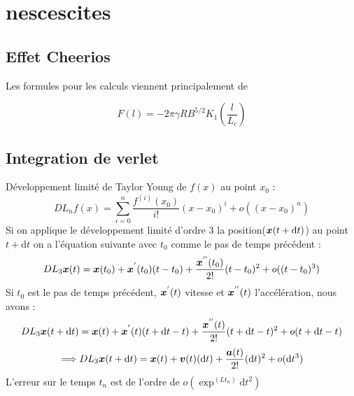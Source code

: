 \documentclass[a4paper, 11pt, oneside]{article} %
\newcommand{\dd}[1]{\mathrm{d}#1}
\begin{document}
    \section{nescescites}
    \subsection{Effet Cheerios}
    Les formules pour les calculs viennent principalement de \cite{vella_cheerios_2005} 

    \begin{equation}
        \label{ForceEntreCheerios}
        F(l) = -2\pi \gamma R B^{5/2} K_1 \left( \frac{l}{L_c}\right)
    \end{equation}
    \subsection{Integration de verlet}
    Développement limité de Taylor Young de $f(x)$ au point $x_0$\cite{agarwal_introduction_2011} :%
    \begin{equation}
        DL_n f(x) = \sum_{i=0}^{n}\frac{f^{(i)}(x_0)}{i!}(x-x_0)^i+ o((x-x_0)^n)
    \end{equation}
    Si on applique le développement limité d'ordre 3 la position($\vb*{x}(t+\dd t)$) au point $t+\dd t$ on a l'équation suivante avec $t_0$ comme le pas de temps précédent :
    \[DL_3 \vb*{x}(t) = \vb*{x}(t_0)+\vb*{x}^{'}(t_0)(t-t_0)+\frac{\vb*{x}^{''}(t_0)}{2!}(t-t_0)^2 +o((t-t_0)^3)\]
    Si $t_0$ est le pas de temps précédent, $\vb*{x}^{'}(t)$ vitesse et $\vb*{x}^{''}(t)$ l'accélération, nous avons :
        \[DL_3 \vb*{x}(t+\dd t) = \vb*{x}(t)+\vb*{x}^{'}(t)(t+\dd t-t)+\frac{\vb*{x}^{''}(t)}{2!}(t+\dd t-t)^2+o(t+\dd t-t)\]
        \[\Longrightarrow DL_3 \vb*{x}(t+\dd t)= \vb*{x}(t)+\vb*{v}(t)(\dd t)+\frac{\vb*{a}(t)}{2!}(\dd t)^2+o(\dd t^3)\]
    L'erreur sur le temps $t_n$ est de l'ordre de $o(\exp^(Lt_n)\dd t^2)$ %
    
\end{document}
